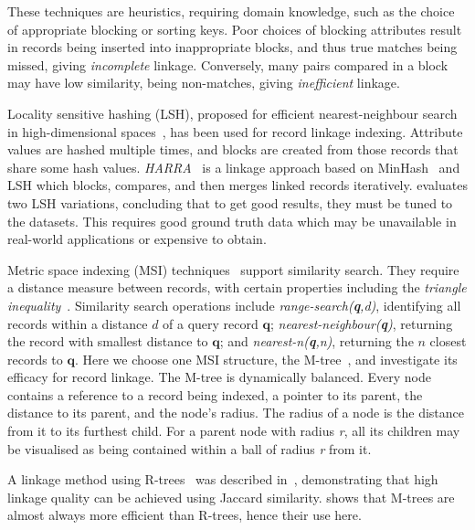 \documentclass{llncs}
\begin{document}
These techniques are heuristics, requiring domain knowledge, such as the
choice of appropriate blocking or sorting keys. Poor choices of blocking
attributes result in records being inserted into inappropriate blocks,
and thus true matches being missed, giving \emph{incomplete} linkage.
Conversely, many pairs compared in a block may have low similarity,
being non-matches, giving \emph{inefficient} linkage.

Locality sensitive hashing (LSH), proposed for efficient
nearest-neighbour search in high-dimensional spaces~\cite{Ind98}, has
been used for record linkage indexing. Attribute values are hashed
multiple times, and blocks are created from those records that share
some hash values. \emph{HARRA}~\cite{Kim10} is a linkage approach based
on MinHash~\cite{Broder1997} and LSH which blocks, compares, and then
merges linked records iteratively. \cite{Steorts2014} evaluates two LSH
variations, concluding that to get good results, they must be tuned to
the datasets. This requires good ground truth data which may be
unavailable in real-world applications or expensive to obtain.

Metric space indexing (MSI) techniques~\cite{Zezula2010} support
similarity search. They require a distance measure between records, with
certain properties including the \emph{triangle
inequality}~\cite{Zezula2010}. Similarity search operations include
\emph{range-search(\textbf{q},d)}, identifying all records within a
distance $d$ of a query record $\mathbf{q}$;
\emph{nearest-neighbour(\textbf{q})}, returning the record with smallest
distance to $\mathbf{q}$; and \emph{nearest-n(\textbf{q},n)}, returning
the $n$ closest records to $\mathbf{q}$. Here we choose one MSI
structure, the M-tree~\cite{Ciaccia97indexingmetric}, and investigate
its efficacy for record linkage. The M-tree is dynamically balanced.
Every node contains a reference to a record being indexed, a pointer to
its parent, the distance to its parent, and the node's radius. The
radius of a node is the distance from it to its furthest child. For a
parent node with radius \textit{r}, all its children may be visualised
as being contained within a ball of radius \textit{r} from it.

A linkage method using R-trees~\cite{Hjaltason1998} was described
in~\cite{Li2006}, demonstrating that high linkage quality can be
achieved using Jaccard similarity. \cite{Ciaccia97indexingmetric} shows
that M-trees are almost always more efficient than R-trees, hence their
use here.

\end{document}
